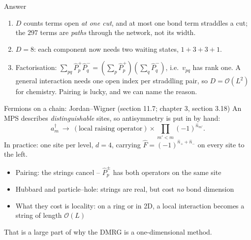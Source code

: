 \documentclass[aspectratio=169,10pt]{beamer}
\newcounter{thinkctr}
\newcommand{\thinka}[1]{%
  \begin{tcolorbox}[colback=paleteal,colframe=teal,title={\bfseries Answer to pause \#\thethinkctr}]
  #1
  \end{tcolorbox}}
\newcommand{\bigO}{\mathcal{O}}
\newcommand{\ad}[1]{a_{#1}^{\dagger}}
\begin{document}
\begin{frame}{Answer}
  \thinka{
  \begin{enumerate}
    \item $D$ counts terms open \emph{at one cut}, and at most one bond term straddles a cut; the $297$ terms are \emph{paths} through the network, not its width.
    \item $D=8$: each component now needs two waiting states, $1+3+3+1$.
    \item \alert{Factorisation:} $\sum_{pq}\hat P^+_p\hat P^-_q=(\sum_p\hat P^+_p)(\sum_q\hat P^-_q)$, i.e.\ $v_{pq}$ has rank one. A general interaction needs one open index per straddling pair, so $D=\bigO(L^2)$ for chemistry. Pairing is lucky, and we can name the reason.
  \end{enumerate}}
\end{frame}

\begin{frame}{Fermions on a chain: Jordan--Wigner (section 11.7; chapter 3, section 3.18)}
  An MPS describes \emph{distinguishable} sites, so antisymmetry is put in by hand:
  \[
    \ad m\ \longrightarrow\ (\text{local raising operator})\times\prod_{m'<m}(-1)^{\hat n_{m'}} .
  \]
  In practice: one site per level, $d=4$, carrying $\hat F=(-1)^{\hat n_++\hat n_-}$ on every site to the left.
  \begin{itemize}
    \item Pairing: the strings \alert{cancel} -- $\hat P^{\pm}_p$ has both operators on the same site
    \item Hubbard and particle--hole: strings are real, but cost \emph{no} bond dimension
    \item What they cost is \alert{locality}: on a ring or in 2D, a local interaction becomes a string of length $\bigO(L)$
  \end{itemize}
  \centering That is a large part of why the DMRG is a one-dimensional method.
\end{frame}
\end{document}
